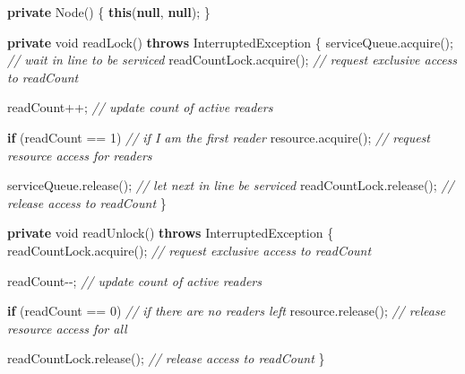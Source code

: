 \documentclass[11pt]{article}
\newenvironment{Shaded}{}{}
\newcommand{\KeywordTok}[1]{\textcolor[rgb]{0.00,0.44,0.13}{\textbf{{#1}}}}
\newcommand{\DataTypeTok}[1]{\textcolor[rgb]{0.56,0.13,0.00}{{#1}}}
\newcommand{\DecValTok}[1]{\textcolor[rgb]{0.25,0.63,0.44}{{#1}}}
\newcommand{\CommentTok}[1]{\textcolor[rgb]{0.38,0.63,0.69}{\textit{{#1}}}}
\newcommand{\FunctionTok}[1]{\textcolor[rgb]{0.02,0.16,0.49}{{#1}}}
\newcommand{\NormalTok}[1]{{#1}}
\newcommand{\ControlFlowTok}[1]{\textcolor[rgb]{0.00,0.44,0.13}{\textbf{{#1}}}}
\newcommand{\OperatorTok}[1]{\textcolor[rgb]{0.40,0.40,0.40}{{#1}}}
\newcommand{\BuiltInTok}[1]{{#1}}
\begin{document}
\begin{Shaded}
\begin{Highlighting}[]
        \KeywordTok{private} \BuiltInTok{Node}\OperatorTok{()} \OperatorTok{\{}
            \KeywordTok{this}\OperatorTok{(}\KeywordTok{null}\OperatorTok{,} \KeywordTok{null}\OperatorTok{);}
        \OperatorTok{\}}

        \KeywordTok{private} \DataTypeTok{void} \FunctionTok{readLock}\OperatorTok{()} \KeywordTok{throws} \BuiltInTok{InterruptedException} \OperatorTok{\{}
\NormalTok{            serviceQueue}\OperatorTok{.}\FunctionTok{acquire}\OperatorTok{();}     \CommentTok{// wait in line to be serviced}
\NormalTok{            readCountLock}\OperatorTok{.}\FunctionTok{acquire}\OperatorTok{();}    \CommentTok{// request exclusive access to readCount}

\NormalTok{            readCount}\OperatorTok{++;} \CommentTok{// update count of active readers}

            \ControlFlowTok{if} \OperatorTok{(}\NormalTok{readCount }\OperatorTok{==} \DecValTok{1}\OperatorTok{)}     \CommentTok{// if I am the first reader}
\NormalTok{                resource}\OperatorTok{.}\FunctionTok{acquire}\OperatorTok{();} \CommentTok{// request resource access for readers}

\NormalTok{            serviceQueue}\OperatorTok{.}\FunctionTok{release}\OperatorTok{();}     \CommentTok{// let next in line be serviced}
\NormalTok{            readCountLock}\OperatorTok{.}\FunctionTok{release}\OperatorTok{();}    \CommentTok{// release access to readCount}
        \OperatorTok{\}}

        \KeywordTok{private} \DataTypeTok{void} \FunctionTok{readUnlock}\OperatorTok{()} \KeywordTok{throws} \BuiltInTok{InterruptedException} \OperatorTok{\{}
\NormalTok{            readCountLock}\OperatorTok{.}\FunctionTok{acquire}\OperatorTok{();} \CommentTok{// request exclusive access to readCount}

\NormalTok{            readCount}\OperatorTok{{-}{-};} \CommentTok{// update count of active readers}

            \ControlFlowTok{if} \OperatorTok{(}\NormalTok{readCount }\OperatorTok{==} \DecValTok{0}\OperatorTok{)}     \CommentTok{// if there are no readers left}
\NormalTok{                resource}\OperatorTok{.}\FunctionTok{release}\OperatorTok{();} \CommentTok{// release resource access for all}

\NormalTok{            readCountLock}\OperatorTok{.}\FunctionTok{release}\OperatorTok{();} \CommentTok{// release access to readCount}
        \OperatorTok{\}}


\end{Highlighting}
\end{Shaded}
\end{document}
